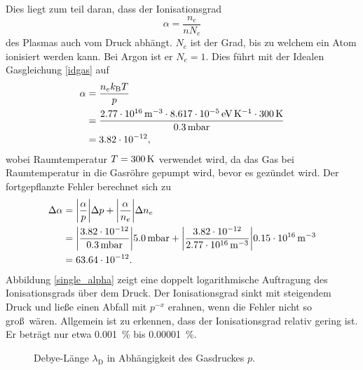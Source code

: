 Dies liegt zum teil daran, dass der Ionisationsgrad
\begin{equation}
\alpha=\frac{n_e}{n N_e}\label{defalpha}
\end{equation}
des Plasmas auch vom Druck abh\"angt.
$N_e$ ist der Grad, bis zu welchem ein Atom ionisiert werden kann.
Bei Argon ist er $N_e=1$.
Dies f\"uhrt mit der Idealen Gasgleichung \eqref{idgas} auf
\begin{align}
\alpha
    &= \frac{n_e k_\text{B} T}{p}\label{salpha}\\
    &= \frac{\siAnea\cdot\sik\cdot\siTroom}{\siApa}\nonumber\\
    &= \siAalphaa\nonumber,
\end{align}
wobei Raumtemperatur $T=\SI{300}{\kelvin}$ verwendet wird, da das Gas bei Raumtemperatur in die Gasr\"ohre gepumpt wird, bevor es gez\"undet wird.
Der fortgepflanzte Fehler berechnet sich zu
\begin{align}
\Delta\alpha
    &=\abs{\frac{\alpha}{p}}\Delta p + \abs{\frac{\alpha}{n_e}}\Delta n_e\\
    &=\abs{\frac{\siAalphaa}{\siApa}}\sierrApa + \abs{\frac{\siAalphaa}{\siAnea}}\sierrAnea\nonumber\\
    &=\sierrAalphaa .\nonumber
\end{align}
Abbildung \vref{single_alpha} zeigt eine doppelt logarithmische Auftragung des Ionisationsgrads \"uber dem Druck.
Der Ionisationsgrad sinkt mit steigendem Druck und lie\ss e einen Abfall mit $p^{-x}$ erahnen, wenn die Fehler nicht so gro\ss\ w\"aren.
Allgemein ist zu erkennen, dass der Ionisationsgrad relativ gering ist.
Er betr\"agt nur etwa \SI{0.001}{\percent} bis \SI{0.00001}{\percent}.

\begin{figure}[htbp]
    \centering
    
    \caption{
        Debye-L\"ange $\lambda_\text{D}$ in Abh\"angigkeit des Gasdruckes $p$.
    }
    \label{single_deb}
\end{figure}

